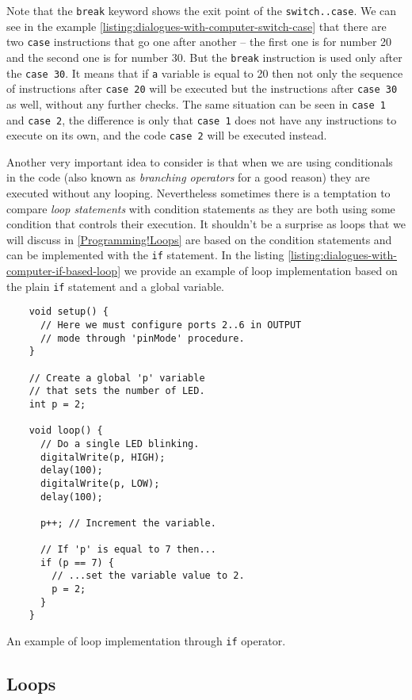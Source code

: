 \documentclass[../sparc.tex]{subfiles}
\begin{document}
Note that the \texttt{break} keyword shows the exit point of the
\texttt{switch..case}.  We can see in the example
\ref{listing:dialogues-with-computer-switch-case} that there are two
\texttt{case} instructions that go one after another -- the first one is for
number 20 and the second one is for number 30.  But the \texttt{break}
instruction is used only after the \texttt{case 30}.  It means that if
\texttt{a} variable is equal to 20 then not only the sequence of instructions
after \texttt{case 20} will be executed but the instructions after \texttt{case
  30} as well, without any further checks.  The same situation can be seen in
\texttt{case 1} and \texttt{case 2}, the difference is only that \texttt{case 1}
does not have any instructions to execute on its own, and the code \texttt{case
  2} will be executed instead.

Another very important idea to consider is that when we are using conditionals
in the code (also known as \emph{branching operators} for a good reason) they
are executed without any looping.  Nevertheless sometimes there is a temptation
to compare \emph{loop statements} with condition statements as they are both
using some condition that controls their execution.  It shouldn't be a surprise
as loops that we will discuss in \ref{Programming!Loops} are based on the
condition statements and can be implemented with the \texttt{if} statement.  In
the listing \ref{listing:dialogues-with-computer-if-based-loop} we provide an
example of loop implementation based on the plain \texttt{if} statement and a
global variable.

\begin{listing}[ht]
  \begin{verbatim}
    void setup() {
      // Here we must configure ports 2..6 in OUTPUT
      // mode through 'pinMode' procedure.
    }

    // Create a global 'p' variable
    // that sets the number of LED.
    int p = 2;

    void loop() {
      // Do a single LED blinking.
      digitalWrite(p, HIGH);
      delay(100);
      digitalWrite(p, LOW);
      delay(100);

      p++; // Increment the variable.

      // If 'p' is equal to 7 then...
      if (p == 7) {
        // ...set the variable value to 2.
        p = 2;
      }
    }
  \end{verbatim}
  \label{listing:dialogues-with-computer-if-based-loop}
  \caption{An example of loop implementation through \texttt{if} operator.}
\end{listing}

\subsection{Loops}
\end{document}
